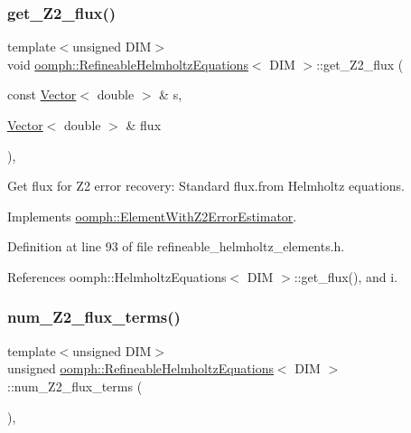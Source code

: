 \subsubsection{\texorpdfstring{get\+\_\+\+Z2\+\_\+flux()}{get\_Z2\_flux()}}
{\footnotesize\ttfamily template$<$unsigned D\+IM$>$ \\
void \hyperlink{classoomph_1_1RefineableHelmholtzEquations}{oomph\+::\+Refineable\+Helmholtz\+Equations}$<$ D\+IM $>$\+::get\+\_\+\+Z2\+\_\+flux (\begin{DoxyParamCaption}\item[{const \hyperlink{classoomph_1_1Vector}{Vector}$<$ double $>$ \&}]{s,  }\item[{\hyperlink{classoomph_1_1Vector}{Vector}$<$ double $>$ \&}]{flux }\end{DoxyParamCaption})\hspace{0.3cm}{\ttfamily [inline]}, {\ttfamily [virtual]}}



Get \textquotesingle{}flux\textquotesingle{} for Z2 error recovery\+: Standard flux.\+from Helmholtz equations. 



Implements \hyperlink{classoomph_1_1ElementWithZ2ErrorEstimator_a5688ff5f546d81771cabad82ca5a7556}{oomph\+::\+Element\+With\+Z2\+Error\+Estimator}.



Definition at line 93 of file refineable\+\_\+helmholtz\+\_\+elements.\+h.



References oomph\+::\+Helmholtz\+Equations$<$ D\+I\+M $>$\+::get\+\_\+flux(), and i.

\mbox{\label{classoomph_1_1RefineableHelmholtzEquations_a715bc9ef2960fd9246557e985c1eba7d}} 
\subsubsection{\texorpdfstring{num\+\_\+\+Z2\+\_\+flux\+\_\+terms()}{num\_Z2\_flux\_terms()}}
{\footnotesize\ttfamily template$<$unsigned D\+IM$>$ \\
unsigned \hyperlink{classoomph_1_1RefineableHelmholtzEquations}{oomph\+::\+Refineable\+Helmholtz\+Equations}$<$ D\+IM $>$\+::num\+\_\+\+Z2\+\_\+flux\+\_\+terms (\begin{DoxyParamCaption}{ }\end{DoxyParamCaption})\hspace{0.3cm}{\ttfamily [inline]}, {\ttfamily [virtual]}}



